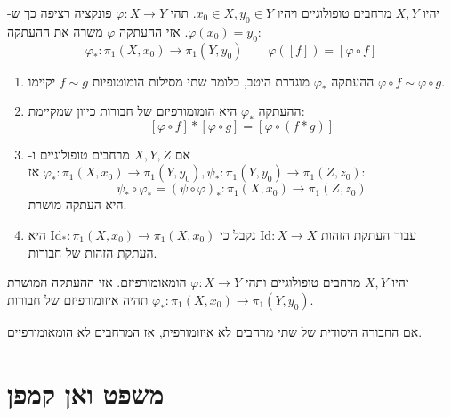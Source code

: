 \documentclass{tstextbook}
\begin{document}
\begin{definition}
יהיו \(X,Y\) מרחבים טופולוגיים ויהיו \(x_{0} \in X,y_{0} \in Y\). תהי \(\varphi:X\to Y\) פונקציה רציפה כך ש-\(\varphi(x_{0})=y_{0}\). אזי ההעתקה \(\varphi\) משרה את ההעתקה:
$$\varphi_{*}:\pi_{1}(X,x_{0})\to\pi_{1}(Y,y_{0})\qquad \varphi([f])=\left[ \varphi \circ  f \right]$$

\end{definition}
\begin{proposition}
  \begin{enumerate}
    \item ההעתקה \(\varphi_{*}\) מוגדרת היטב, כלומר שתי מסילות הומוטופיות \(f\sim g\) יקיימו \(\varphi \circ f \sim \varphi \circ g\). 


    \item ההעתקה \(\varphi_{*}\) היא הומומורפיזם של חבורות כיוון שמקיימת: 
$$\left[ \varphi \circ f \right]*\left[ \varphi \circ g \right]=\left[ \varphi \circ (f*g) \right]$$


    \item אם \(X,Y,Z\) מרחבים טופולוגיים ו-\(\varphi_{*}:\pi_{1}(X,x_{0})\to\pi_{1}(Y,y_{0}),\psi_*:\pi_{1}(Y,y_{0})\to\pi_{1}(Z,z_{0})\) אז: 
$$\psi_{*}\circ \varphi_{*}=\left( \psi\circ \varphi \right)_{*}:\pi_{1}(X,x_{0})\to\pi_{1}(Z,z_{0})$$
היא העתקה מושרת.


    \item עבור העתקת הזהות \(\mathrm{Id}:X\to X\) נקבל כי \(\mathrm{Id}_{*}:\pi_{1}(X,x_{0})\to\pi_{1}(X,x_{0})\) היא העתקת הזהות של חבורות. 


  \end{enumerate}
\end{proposition}
\begin{proposition}
יהיו \(X,Y\) מרחבים טופולוגיים ותהי \(\varphi:X\to Y\) הומאומורפיזם. אזי ההעתקה המושרת \(\varphi_{*}:\pi_{1}(X,x_{0})\to\pi_{1}(Y,y_{0})\) תהיה איזומורפיזם של חבורות.

\end{proposition}
\begin{corollary}
אם החבורה היסודית של שתי מרחבים לא איזומורפית, אז המרחבים לא הומאומורפיים.

\end{corollary}
\section{משפט ואן קמפן}
\end{document}

